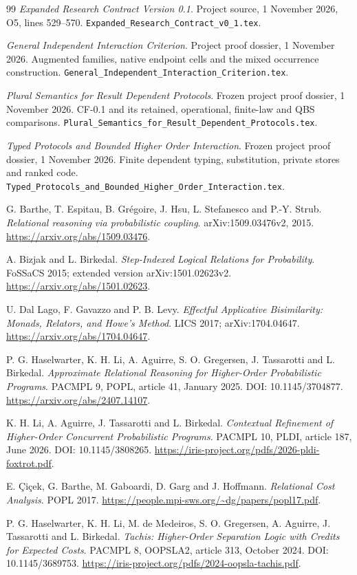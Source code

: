 \documentclass[11pt,a4paper]{article}
\theoremstyle{definition}
\begin{document}
\begin{thebibliography}{99}
\emph{Expanded Research Contract Version 0.1}. Project source,
1 November 2026, O5, lines 529--570.
\texttt{Expanded\_Research\_Contract\_v0\_1.tex}.

\emph{General Independent Interaction Criterion}. Project proof dossier,
1 November 2026. Augmented families, native endpoint cells and the mixed
occurrence construction.
\texttt{General\_Independent\_Interaction\_Criterion.tex}.

\emph{Plural Semantics for Result Dependent Protocols}. Frozen project
proof dossier, 1 November 2026. CF-0.1 and its retained, operational,
finite-law and QBS comparisons.
\texttt{Plural\_Semantics\_for\_Result\_Dependent\_Protocols.tex}.

\emph{Typed Protocols and Bounded Higher Order Interaction}. Frozen
project proof dossier, 1 November 2026. Finite dependent typing,
substitution, private stores and ranked code.
\texttt{Typed\_Protocols\_and\_Bounded\_Higher\_Order\_Interaction.tex}.

G. Barthe, T. Espitau, B. Gr\'{e}goire, J. Hsu, L. Stefanesco and
P.-Y. Strub. \emph{Relational reasoning via probabilistic coupling}.
arXiv:1509.03476v2, 2015. \url{https://arxiv.org/abs/1509.03476}.

A. Bizjak and L. Birkedal. \emph{Step-Indexed Logical Relations for
Probability}. FoSSaCS 2015; extended version arXiv:1501.02623v2.
\url{https://arxiv.org/abs/1501.02623}.

U. Dal Lago, F. Gavazzo and P. B. Levy. \emph{Effectful Applicative
Bisimilarity: Monads, Relators, and Howe's Method}. LICS 2017;
arXiv:1704.04647. \url{https://arxiv.org/abs/1704.04647}.

P. G. Haselwarter, K. H. Li, A. Aguirre, S. O. Gregersen, J. Tassarotti
and L. Birkedal. \emph{Approximate Relational Reasoning for Higher-Order
Probabilistic Programs}. PACMPL 9, POPL, article 41, January 2025.
DOI: 10.1145/3704877. \url{https://arxiv.org/abs/2407.14107}.

K. H. Li, A. Aguirre, J. Tassarotti and L. Birkedal.
\emph{Contextual Refinement of Higher-Order Concurrent Probabilistic
Programs}. PACMPL 10, PLDI, article 187, June 2026.
DOI: 10.1145/3808265.
\url{https://iris-project.org/pdfs/2026-pldi-foxtrot.pdf}.

E. \c{C}i\c{c}ek, G. Barthe, M. Gaboardi, D. Garg and J. Hoffmann.
\emph{Relational Cost Analysis}. POPL 2017.
\url{https://people.mpi-sws.org/~dg/papers/popl17.pdf}.

P. G. Haselwarter, K. H. Li, M. de Medeiros, S. O. Gregersen,
A. Aguirre, J. Tassarotti and L. Birkedal.
\emph{Tachis: Higher-Order Separation Logic with Credits for Expected
Costs}. PACMPL 8, OOPSLA2, article 313, October 2024.
DOI: 10.1145/3689753.
\url{https://iris-project.org/pdfs/2024-oopsla-tachis.pdf}.
\end{thebibliography}
\end{document}
